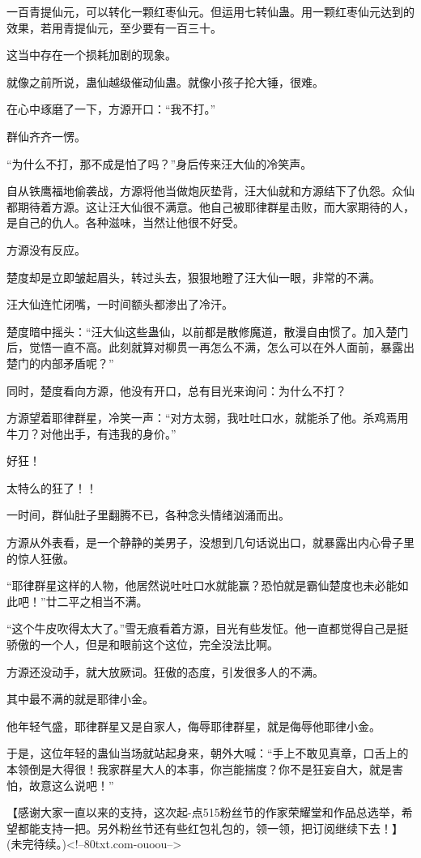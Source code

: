 \begin{this_body}
一百青提仙元，可以转化一颗红枣仙元。但运用七转仙蛊。用一颗红枣仙元达到的效果，若用青提仙元，至少要有一百三十。

这当中存在一个损耗加剧的现象。

就像之前所说，蛊仙越级催动仙蛊。就像小孩子抡大锤，很难。

在心中琢磨了一下，方源开口：“我不打。”

群仙齐齐一愣。

“为什么不打，那不成是怕了吗？”身后传来汪大仙的冷笑声。

自从铁鹰福地偷袭战，方源将他当做炮灰垫背，汪大仙就和方源结下了仇怨。众仙都期待着方源。这让汪大仙很不满意。他自己被耶律群星击败，而大家期待的人，是自己的仇人。各种滋味，当然让他很不好受。

方源没有反应。

楚度却是立即皱起眉头，转过头去，狠狠地瞪了汪大仙一眼，非常的不满。

汪大仙连忙闭嘴，一时间额头都渗出了冷汗。

楚度暗中摇头：“汪大仙这些蛊仙，以前都是散修魔道，散漫自由惯了。加入楚门后，觉悟一直不高。此刻就算对柳贯一再怎么不满，怎么可以在外人面前，暴露出楚门的内部矛盾呢？”

同时，楚度看向方源，他没有开口，总有目光来询问：为什么不打？

方源望着耶律群星，冷笑一声：“对方太弱，我吐吐口水，就能杀了他。杀鸡焉用牛刀？对他出手，有违我的身价。”

好狂！

太特么的狂了！！

一时间，群仙肚子里翻腾不已，各种念头情绪汹涌而出。

方源从外表看，是一个静静的美男子，没想到几句话说出口，就暴露出内心骨子里的惊人狂傲。

“耶律群星这样的人物，他居然说吐吐口水就能赢？恐怕就是霸仙楚度也未必能如此吧！”廿二平之相当不满。

“这个牛皮吹得太大了。”雪无痕看着方源，目光有些发怔。他一直都觉得自己是挺骄傲的一个人，但是和眼前这个这位，完全没法比啊。

方源还没动手，就大放厥词。狂傲的态度，引发很多人的不满。

其中最不满的就是耶律小金。

他年轻气盛，耶律群星又是自家人，侮辱耶律群星，就是侮辱他耶律小金。

于是，这位年轻的蛊仙当场就站起身来，朝外大喊：“手上不敢见真章，口舌上的本领倒是大得很！我家群星大人的本事，你岂能揣度？你不是狂妄自大，就是害怕，故意这么说吧！”

【感谢大家一直以来的支持，这次起-点515粉丝节的作家荣耀堂和作品总选举，希望都能支持一把。另外粉丝节还有些红包礼包的，领一领，把订阅继续下去！】(未完待续。)<!--80txt.com-ouoou-->


\end{this_body}

